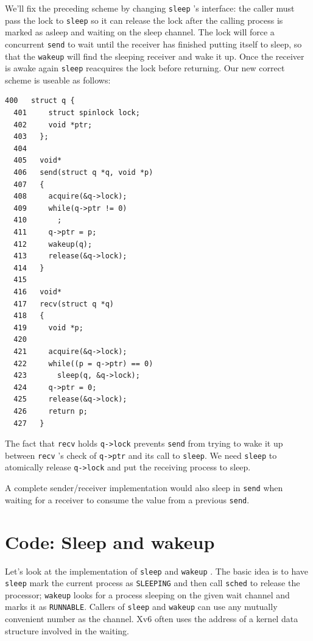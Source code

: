 We'll fix the preceding scheme by changing
\lstinline{sleep} 's
interface:
the caller must pass the lock to
\lstinline{sleep}
so it can release the lock after
the calling process is marked as asleep and waiting on the
sleep channel.
The lock will force a concurrent
\lstinline{send}
to wait until the receiver has finished putting itself to sleep,
so that the
\lstinline{wakeup}
will find the sleeping receiver and wake it up.
Once the receiver is awake again
\lstinline{sleep}
reacquires the lock before returning.
Our new correct scheme is useable as follows:
\begin{lstlisting}[]
  400	struct q {
  401	  struct spinlock lock;
  402	  void *ptr;
  403	};
  404	
  405	void*
  406	send(struct q *q, void *p)
  407	{
  408	  acquire(&q->lock);
  409	  while(q->ptr != 0)
  410	    ;
  411	  q->ptr = p;
  412	  wakeup(q);
  413	  release(&q->lock);
  414	}
  415	
  416	void*
  417	recv(struct q *q)
  418	{
  419	  void *p;
  420	
  421	  acquire(&q->lock);
  422	  while((p = q->ptr) == 0)
  423	    sleep(q, &q->lock);
  424	  q->ptr = 0;
  425	  release(&q->lock);
  426	  return p;
  427	}
\end{lstlisting}

The fact that
\lstinline{recv}
holds
\lstinline{q->lock}
prevents 
\lstinline{send}
from trying to wake it up between 
\lstinline{recv} 's
check of
\lstinline{q->ptr}
and its call to
\lstinline{sleep}.
We need
\lstinline{sleep}
to atomically release
\lstinline{q->lock}
and put the receiving process to sleep.

A complete sender/receiver implementation would also sleep
in
\lstinline{send}
when waiting for a receiver to consume
the value from a previous
\lstinline{send}.
\section{Code: Sleep and wakeup}

Let's look at the implementation of
\lstinline{sleep}
and
\lstinline{wakeup}
.
The basic idea is to have
\lstinline{sleep}
mark the current process as
\lstinline{SLEEPING}
and then call
\lstinline{sched}
to release the processor;
\lstinline{wakeup}
looks for a process sleeping on the given wait channel
and marks it as 
\lstinline{RUNNABLE}.
Callers of
\lstinline{sleep}
and
\lstinline{wakeup}
can use any mutually convenient number as the channel.
Xv6 often uses the address
of a kernel data structure involved in the waiting.

